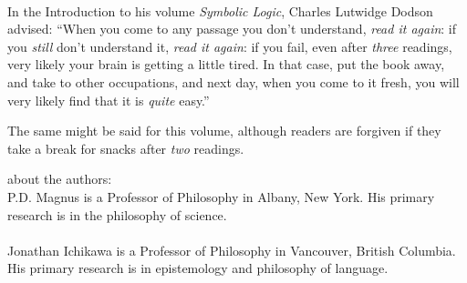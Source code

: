 \thispagestyle{empty}
\onecolumn
\ 
\vfill

\parbox{3 in}{
In the Introduction to his volume \emph{Symbolic Logic}, Charles Lutwidge Dodson advised: ``When you come to any passage you don't understand, \emph{read it again}: if you \emph{still} don't understand it, \emph{read it again}: if you fail, even after \emph{three} readings, very likely your brain is getting a little tired. In that case, put the book away, and take to other occupations, and next day, when you come to it fresh, you will very likely find that it is \emph{quite} easy.''

\medskip

The same might be said for this volume, although readers are forgiven if they take a break for snacks after \emph{two} readings.
}

\vfill

\parbox{3 in}{
{\sf about the authors:}
\\
P.D. Magnus is a Professor of Philosophy in Albany, New York. His primary research is in the philosophy of science.\\
\\
Jonathan Ichikawa is a Professor of Philosophy in Vancouver, British Columbia. His primary research is in epistemology and philosophy of language.
}
\vfill
